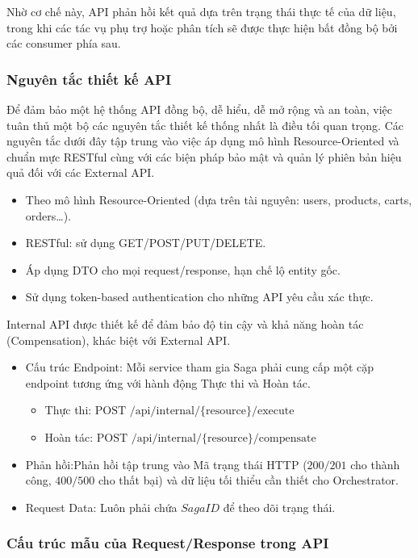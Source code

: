 Nhờ cơ chế này, API phản hồi kết quả dựa trên trạng thái thực tế của dữ liệu, trong khi các tác vụ phụ trợ hoặc phân tích sẽ được thực hiện bất đồng bộ bởi các consumer phía sau.

\subsubsection{Nguyên tắc thiết kế API}

Để đảm bảo một hệ thống API đồng bộ, dễ hiểu, dễ mở rộng và an toàn, việc tuân thủ một bộ các nguyên tắc thiết kế thống nhất là điều tối quan trọng. Các nguyên tắc dưới đây tập trung vào việc áp dụng mô hình Resource-Oriented và chuẩn mực RESTful cùng với các biện pháp bảo mật và quản lý phiên bản hiệu quả đối với các External API.
\begin{itemize}
    \item Theo mô hình Resource-Oriented (dựa trên tài nguyên: users, products, carts, orders…).
    \item RESTful: sử dụng GET/POST/PUT/DELETE.
    \item Áp dụng DTO cho mọi request/response, hạn chế lộ entity gốc.
    \item Sử dụng token-based authentication cho những API yêu cầu xác thực.
\end{itemize}

Internal API được thiết kế để đảm bảo độ tin cậy và khả năng hoàn tác (Compensation), khác biệt với External API.

\begin{itemize}
    \item Cấu trúc Endpoint: Mỗi service tham gia Saga phải cung cấp một cặp endpoint tương ứng với hành động Thực thi và Hoàn tác.
    \begin{itemize}
        \item Thực thi: $\text{POST}$ $\text{/api/internal/\{resource\}/execute}$
        \item Hoàn tác: $\text{POST}$ $\text{/api/internal/\{resource\}/compensate}$
    \end{itemize}
    \item Phản hồi:Phản hồi tập trung vào Mã trạng thái HTTP ($200/\text{201}$ cho thành công, $400/500$ cho thất bại) và dữ liệu tối thiểu cần thiết cho Orchestrator.
    \item Request Data: Luôn phải chứa $SagaID$ để theo dõi trạng thái.
\end{itemize}

\subsubsection{Cấu trúc mẫu của Request/Response trong API}

